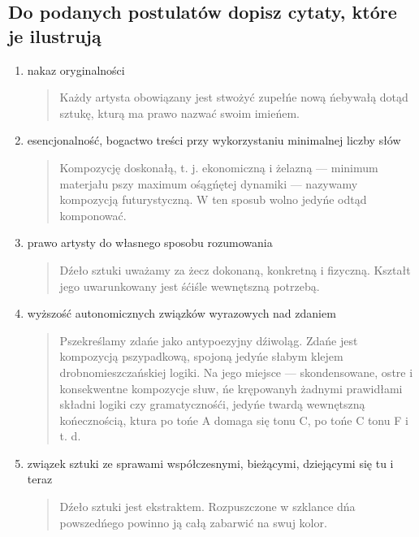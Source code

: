 \documentclass[a4paper]{article}
\begin{document}
\subsection{Do podanych postulatów dopisz cytaty, które je ilustrują}
\begin{enumerate}
    \item nakaz oryginalności \begin{quote}
        Każdy artysta obowiązany jest stwożyć zupełńe nową ńebywałą dotąd sztukę, kturą ma prawo nazwać swoim imieńem.
    \end{quote}
    \item esencjonalność, bogactwo treści przy wykorzystaniu minimalnej liczby słów \begin{quote}
        Kompozycję doskonałą, t. j. ekonomiczną i żelazną — minimum materjału pszy maximum ośągńętej dynamiki — nazywamy kompozycją futurystyczną. W ten sposub wolno jedyńe odtąd komponować.
    \end{quote}
    \item prawo artysty do własnego sposobu rozumowania \begin{quote}
        Dźeło sztuki uważamy za żecz dokonaną, konkretną i fizyczną. Kształt jego uwarunkowany jest śćiśle wewnętszną potrzebą.
    \end{quote}
    \item wyższość autonomicznych związków wyrazowych nad zdaniem \begin{quote}
        Pszekreślamy zdańe jako antypoezyjny dźiwoląg. Zdańe jest kompozycją pszypadkową, spojoną jedyńe słabym klejem drobnomieszczańskiej logiki. Na jego miejsce — skondensowane, ostre i konsekwentne kompozycje słuw, ńe krępowanyh żadnymi prawidłami składni logiki czy gramatycznośći, jedyńe twardą wewnętszną końecznością, ktura po tońe A domaga się tonu C, po tońe C tonu F i t. d.
    \end{quote}
    \item związek sztuki ze sprawami współczesnymi, bieżącymi, dziejącymi się tu i teraz \begin{quote}
        Dźeło sztuki jest ekstraktem. Rozpuszczone w szklance dńa powszedńego powinno ją całą zabarwić na swuj kolor.
    \end{quote}
\end{enumerate}
\end{document}
